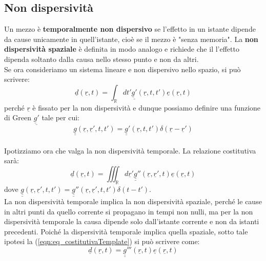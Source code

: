 \documentclass{book}
\begin{document}
            \subsection{Non dispersività}
            Un mezzo è \textbf{temporalmente non dispersivo} se l'effetto in un istante dipende da cause unicamente in quell'istante, cioè se il mezzo è "senza memoria". La \textbf{non dispersività spaziale} è definita in modo analogo e richiede che il l'effetto dipenda soltanto dalla causa nello stesso punto e non da altri. \\
            Se ora consideriamo un sistema lineare e non dispersivo nello spazio, si può scrivere:
            \begin{equation}
                \underline{d}(\underline{r},t) = \int_{\mathbb{R}} dt' \underline{\underline{g}'}(\underline{r}, t, t') \underline{e}(\underline{r}, t)
            \end{equation}
            perché $\underline{r}$ è fissato per la non dispersività e dunque possiamo definire una funzione di Green $\underline{\underline{g}'}$ tale per cui:
            \begin{equation}
                \underline{\underline{g}}(\underline{r}, \underline{r}', t, t') = \underline{\underline{g}}' (\underline{r}, t, t')\delta(\underline{r}-\underline{r}')
            \end{equation}
            \\ Ipotizziamo ora che valga la non dispersività temporale. La relazione costitutiva sarà:
            \begin{equation}
                \underline{d} (\underline{r}, t) = \iiint_{\mathbb{R}} d \underline{r}' \underline{\underline{g}}'' (\underline{r}, \underline{r}', t) \underline{e}(\underline{r},t)
            \end{equation}
            dove $\underline{\underline{g}} (\underline{r}, \underline{r}', t, t') = \underline{\underline{g}}''(\underline{r}, \underline{r}', t, t') \delta(t-t')$. \\
            La non dispersività temporale implica la non dispersività spaziale, perché le cause in altri punti da quello corrente si propagano in tempi non nulli, ma per la non dispersività temporale la causa dipende solo dall'istante corrente e non da istanti precedenti.
            Poiché la dispersività temporale implica quella spaziale, sotto tale ipotesi la (\ref{eqn:eq_costitutivaTemplate}) si può scrivere come:
            \begin{equation}
                \underline{d} (\underline{r}, t) = \underline{\underline{g}}''' (\underline{r}, t) \underline{e}(\underline{r}, t)
            \end{equation}
\end{document}
